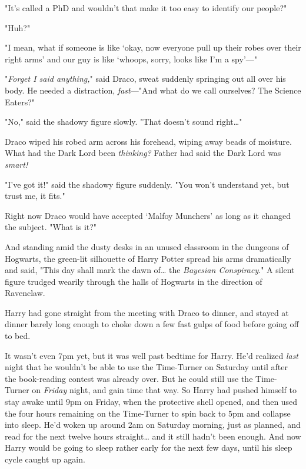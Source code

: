 "It's called a PhD and wouldn't that make it too easy to identify our people?"

"Huh?"

"I mean, what if someone is like `okay, now everyone pull up their robes over 
their right arms' and our guy is like `whoops, sorry, looks like I'm a spy'---"

"\emph{Forget I said anything,}" said Draco, sweat suddenly springing out all 
over his body. He needed a distraction, \emph{fast}---"And what do we call 
ourselves? The Science Eaters?"

"No," said the shadowy figure slowly. "That doesn't sound right{\ldots}"

Draco wiped his robed arm across his forehead, wiping away beads of moisture. 
What had the Dark Lord been \emph{thinking?} Father had said the Dark Lord was 
\emph{smart!}

"I've got it!" said the shadowy figure suddenly. "You won't understand yet, but 
trust me, it fits."

Right now Draco would have accepted `Malfoy Munchers' as long as it changed the 
subject. "What is it?"

And standing amid the dusty desks in an unused classroom in the dungeons of 
Hogwarts, the green-lit silhouette of Harry Potter spread his arms dramatically 
and said, "This day shall mark the dawn of{\ldots} the \emph{Bayesian 
Conspiracy}."
\sbreak
A silent figure trudged wearily through the halls of Hogwarts in the direction 
of Ravenclaw.

Harry had gone straight from the meeting with Draco to dinner, and stayed at 
dinner barely long enough to choke down a few fast gulps of food before going 
off to bed.

It wasn't even 7pm yet, but it was well past bedtime for Harry. He'd realized 
\emph{last} night that he wouldn't be able to use the Time-Turner on Saturday 
until after the book-reading contest was already over. But he could still use 
the Time-Turner on \emph{Friday} night, and gain time that way. So Harry had 
pushed himself to stay awake until 9pm on Friday, when the protective shell 
opened, and then used the four hours remaining on the Time-Turner to spin back 
to 5pm and collapse into sleep. He'd woken up around 2am on Saturday morning, 
just as planned, and read for the next twelve hours straight{\ldots} and it 
still hadn't been enough. And now Harry would be going to sleep rather early 
for the next few days, until his sleep cycle caught up again.

